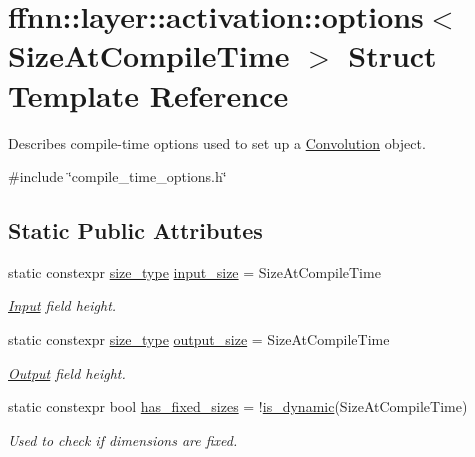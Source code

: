 \hypertarget{structffnn_1_1layer_1_1activation_1_1options}{\section{ffnn\-:\-:layer\-:\-:activation\-:\-:options$<$ Size\-At\-Compile\-Time $>$ Struct Template Reference}
\label{structffnn_1_1layer_1_1activation_1_1options}
}


Describes compile-\/time options used to set up a \hyperlink{classffnn_1_1layer_1_1_convolution}{Convolution} object.  




{\ttfamily \#include \char`\"{}compile\-\_\-time\-\_\-options.\-h\char`\"{}}

\subsection*{Static Public Attributes}
\begin{DoxyCompactItemize}
\item 
static constexpr \hyperlink{namespaceffnn_a63b90a2fd70eb76684eac482a51633e5}{size\-\_\-type} \hyperlink{structffnn_1_1layer_1_1activation_1_1options_ae32f71e7e41f1adc1c29eb94d8138cab}{input\-\_\-size} = Size\-At\-Compile\-Time
\begin{DoxyCompactList}\small\item\em \hyperlink{classffnn_1_1layer_1_1_input}{Input} field height. \end{DoxyCompactList}\item 
static constexpr \hyperlink{namespaceffnn_a63b90a2fd70eb76684eac482a51633e5}{size\-\_\-type} \hyperlink{structffnn_1_1layer_1_1activation_1_1options_a21ed6511496f57fe62bd15f71c2c14ef}{output\-\_\-size} = Size\-At\-Compile\-Time
\begin{DoxyCompactList}\small\item\em \hyperlink{classffnn_1_1layer_1_1_output}{Output} field height. \end{DoxyCompactList}\item 
static constexpr bool \hyperlink{structffnn_1_1layer_1_1activation_1_1options_a13a10e2f2f0c480715aa64ef95d32c57}{has\-\_\-fixed\-\_\-sizes} = !\hyperlink{namespaceffnn_1_1layer_a83ba223c7b7eb8e3d926b98b266f24c8}{is\-\_\-dynamic}(Size\-At\-Compile\-Time)
\begin{DoxyCompactList}\small\item\em Used to check if dimensions are fixed. \end{DoxyCompactList}\end{DoxyCompactItemize}


